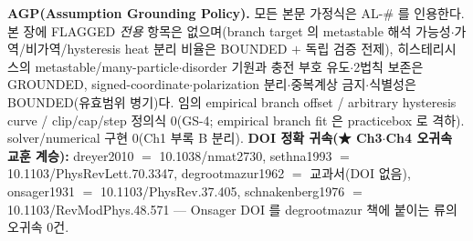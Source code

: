 \documentclass[11pt,a4paper]{article}
\begin{document}
\textbf{AGP(Assumption Grounding Policy).} 모든 본문 가정식은 AL-\# 를 인용한다. 본 장에 FLAGGED \emph{전용}
항목은 없으며(branch target 의 metastable 해석 가능성$\cdot$가역/비가역/hysteresis heat 분리 비율은 BOUNDED $+$
독립 검증 전제), 히스테리시스의 metastable/many-particle$\cdot$disorder 기원과 충전 부호 유도$\cdot$2법칙 보존은
GROUNDED, signed-coordinate$\cdot$polarization 분리$\cdot$중복계상 금지$\cdot$식별성은 BOUNDED(유효범위 병기)다.
임의 empirical branch offset / arbitrary hysteresis curve / clip/cap/step 정의식 0(GS-4; empirical branch fit
은 practicebox 로 격하). solver/numerical 구현 0(Ch1 부록 B 분리). \textbf{DOI 정확 귀속(★ Ch3$\cdot$Ch4 오귀속 교훈
계승):} dreyer2010 $=$ 10.1038/nmat2730, sethna1993 $=$ 10.1103/PhysRevLett.70.3347, degrootmazur1962 $=$
교과서(DOI 없음), onsager1931 $=$ 10.1103/PhysRev.37.405, schnakenberg1976 $=$ 10.1103/RevModPhys.48.571 —
Onsager DOI 를 degrootmazur 책에 붙이는 류의 오귀속 0건.

\end{document}

